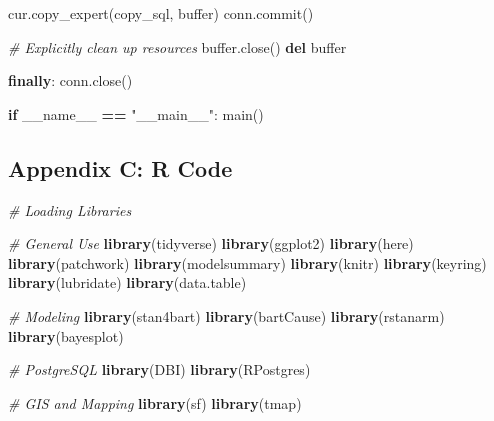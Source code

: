 \documentclass[
  12pt,
]{article}
\newenvironment{Shaded}{\begin{snugshade}}{\end{snugshade}}
\newcommand{\BuiltInTok}[1]{#1}
\newcommand{\CommentTok}[1]{\textcolor[rgb]{0.56,0.35,0.01}{\textit{#1}}}
\newcommand{\ControlFlowTok}[1]{\textcolor[rgb]{0.13,0.29,0.53}{\textbf{#1}}}
\newcommand{\FunctionTok}[1]{\textcolor[rgb]{0.13,0.29,0.53}{\textbf{#1}}}
\newcommand{\KeywordTok}[1]{\textcolor[rgb]{0.13,0.29,0.53}{\textbf{#1}}}
\newcommand{\NormalTok}[1]{#1}
\newcommand{\OperatorTok}[1]{\textcolor[rgb]{0.81,0.36,0.00}{\textbf{#1}}}
\newcommand{\StringTok}[1]{\textcolor[rgb]{0.31,0.60,0.02}{#1}}
\newcommand{\VariableTok}[1]{\textcolor[rgb]{0.00,0.00,0.00}{#1}}
\begin{document}
\begin{Shaded}
\begin{Highlighting}[]
\NormalTok{                    cur.copy\_expert(copy\_sql, }\BuiltInTok{buffer}\NormalTok{)}
\NormalTok{                    conn.commit()}
                    
                    \CommentTok{\# Explicitly clean up resources}
                    \BuiltInTok{buffer}\NormalTok{.close()}
                    \KeywordTok{del} \BuiltInTok{buffer}

    \ControlFlowTok{finally}\NormalTok{:}
\NormalTok{        conn.close()}


\ControlFlowTok{if} \VariableTok{\_\_name\_\_} \OperatorTok{==} \StringTok{"\_\_main\_\_"}\NormalTok{:}
\NormalTok{    main()}
\end{Highlighting}
\end{Shaded}

\subsection{Appendix C: R Code}\label{appendix-c-r-code}

\begin{Shaded}
\begin{Highlighting}[]
\CommentTok{\# Loading Libraries}

\CommentTok{\# General Use}
\FunctionTok{library}\NormalTok{(tidyverse)}
\FunctionTok{library}\NormalTok{(ggplot2)}
\FunctionTok{library}\NormalTok{(here)}
\FunctionTok{library}\NormalTok{(patchwork)}
\FunctionTok{library}\NormalTok{(modelsummary)}
\FunctionTok{library}\NormalTok{(knitr)}
\FunctionTok{library}\NormalTok{(keyring)}
\FunctionTok{library}\NormalTok{(lubridate)}
\FunctionTok{library}\NormalTok{(data.table)}

\CommentTok{\# Modeling}
\FunctionTok{library}\NormalTok{(stan4bart)}
\FunctionTok{library}\NormalTok{(bartCause)}
\FunctionTok{library}\NormalTok{(rstanarm)}
\FunctionTok{library}\NormalTok{(bayesplot)}

\CommentTok{\# PostgreSQL}
\FunctionTok{library}\NormalTok{(DBI)}
\FunctionTok{library}\NormalTok{(RPostgres)}

\CommentTok{\# GIS and Mapping}
\FunctionTok{library}\NormalTok{(sf)}
\FunctionTok{library}\NormalTok{(tmap)}
\end{Highlighting}
\end{Shaded}
\end{document}
